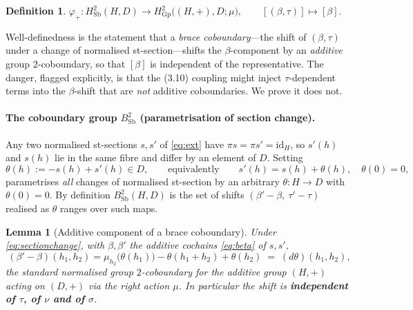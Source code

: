 \documentclass[11pt]{article}
\newtheorem{lemma}[theorem]{Lemma}
\theoremstyle{definition}
\newtheorem{definition}[theorem]{Definition}
\newcommand{\Sb}{\mathrm{Sb}}
\newcommand{\Gp}{\mathrm{Gp}}
\newcommand{\id}{\mathrm{id}}
\begin{document}
\begin{definition}
$\displaystyle \varphi_+:H^2_\Sb(H,D)\longrightarrow H^2_\Gp\bigl((H,+),D;\mu\bigr),\qquad
[(\beta,\tau)]\longmapsto[\beta].$
\end{definition}

Well-definedness is the statement that a \emph{brace coboundary}---the shift of $(\beta,\tau)$
under a change of normalised st-section---shifts the $\beta$-component by an
\emph{additive} group $2$-coboundary, so that $[\beta]$ is independent of the representative.
The danger, flagged explicitly, is that the (3.10) coupling might inject $\tau$-dependent
terms into the $\beta$-shift that are \emph{not} additive coboundaries. We prove it does not.

\paragraph{The coboundary group $B^2_\Sb$ (parametrisation of section change).}
Any two normalised st-sections $s,s'$ of \eqref{eq:ext} have $\pi s=\pi s'=\id_H$, so
$s'(h)$ and $s(h)$ lie in the same fibre and differ by an element of $D$. Setting
\begin{equation}\label{eq:sectionchange}
\theta(h):=-s(h)+s'(h)\in D,\qquad\text{equivalently}\qquad s'(h)=s(h)+\theta(h),\quad \theta(0)=0,
\end{equation}
parametrises \emph{all} changes of normalised st-section by an arbitrary $\theta:H\to D$ with
$\theta(0)=0$. By definition $B^2_\Sb(H,D)$ is the set of shifts
$(\beta'-\beta,\ \tau'-\tau)$ realised as $\theta$ ranges over such maps.

\begin{lemma}[Additive component of a brace coboundary]\label{lem:betacobound}
Under \eqref{eq:sectionchange}, with $\beta,\beta'$ the additive cochains \eqref{eq:beta}
of $s,s'$,
\begin{equation}\label{eq:betashift}
(\beta'-\beta)(h_1,h_2)=\mu_{h_2}\bigl(\theta(h_1)\bigr)-\theta(h_1+h_2)+\theta(h_2)
\;=\;(d\theta)(h_1,h_2),
\end{equation}
the standard normalised group $2$-coboundary for the additive group $(H,+)$ acting on $(D,+)$
via the right action $\mu$. In particular the shift is \textbf{independent of $\tau$, of $\nu$
and of $\sigma$}.
\end{lemma}
\end{document}
